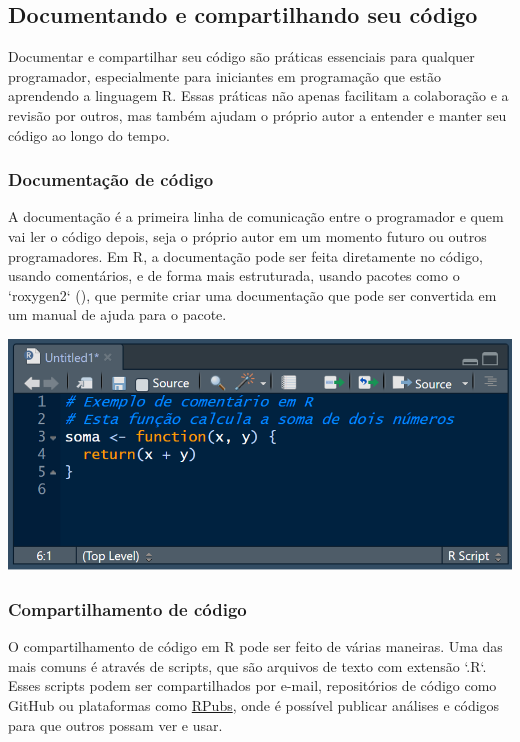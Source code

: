\documentclass[
]{book}
\begin{document}
\subsection{Documentando e compartilhando seu código}\label{documentando-e-compartilhando-seu-cuxf3digo}

Documentar e compartilhar seu código são práticas essenciais para qualquer programador, especialmente para iniciantes em programação que estão aprendendo a linguagem R. Essas práticas não apenas facilitam a colaboração e a revisão por outros, mas também ajudam o próprio autor a entender e manter seu código ao longo do tempo.

\subsubsection{Documentação de código}\label{documentauxe7uxe3o-de-cuxf3digo}

A documentação é a primeira linha de comunicação entre o programador e quem vai ler o código depois, seja o próprio autor em um momento futuro ou outros programadores. Em R, a documentação pode ser feita diretamente no código, usando comentários, e de forma mais estruturada, usando pacotes como o `roxygen2` (), que permite criar uma documentação que pode ser convertida em um manual de ajuda para o pacote.

\includegraphics{images/clipboard-3987177554.png}

\subsubsection{Compartilhamento de código}\label{compartilhamento-de-cuxf3digo}

O compartilhamento de código em R pode ser feito de várias maneiras. Uma das mais comuns é através de scripts, que são arquivos de texto com extensão `.R`. Esses scripts podem ser compartilhados por e-mail, repositórios de código como GitHub ou plataformas como \href{https://rpubs.com}{RPubs}, onde é possível publicar análises e códigos para que outros possam ver e usar.
\end{document}
